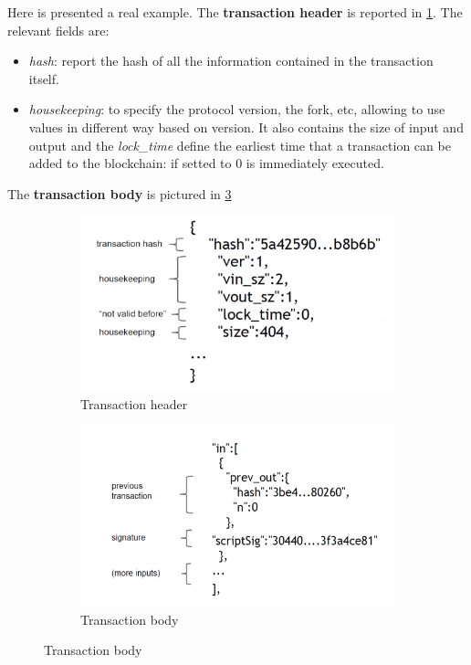 \documentclass[10pt,a4paper]{report}
\begin{document}
Here is presented a real example. The \textbf{transaction header} is reported in \ref{tx-header}.
The relevant fields are:
\begin{itemize}
	\item 
	\textit{hash}:  report the hash of all the information contained in the transaction itself.
	\item 
	\textit{housekeeping}: to specify the protocol version, the fork, etc, allowing to use values in different way based on version. It also contains the size of input and output and the \textit{lock\_time} define the earliest time that a transaction can be added to the blockchain: if setted to 0 is immediately executed.
\end{itemize}
The \textbf{transaction body} is pictured in \ref{tx-body}
\begin{figure}[h]
	\centering
	\begin{subfigure}{.5\textwidth}
		\centering
		\includegraphics[width=.9\linewidth]{images/Pasted image 20230329123352.png}
		\caption{Transaction header}
		\label{tx-header}
	\end{subfigure}%
	\begin{subfigure}{.5\textwidth}
		\centering
		\includegraphics[width=.9\linewidth]{images/Pasted image 20230329123816.png}
		\caption{Transaction body}
		\label{tx-body}
	\end{subfigure}
\end{figure}
\end{document}
